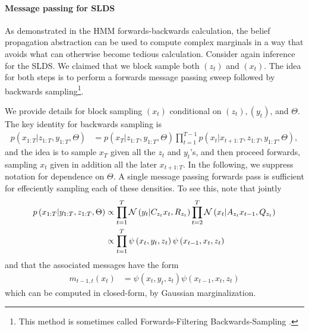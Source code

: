 \documentclass{article}
\begin{document}
\paragraph{Message passing for SLDS}

As demonstrated in the HMM forwards-backwards calculation, the belief
propagation abstraction can be used to compute complex marginals in a way that
avoids what can otherwise become tedious calculation. Consider again inference
for the SLDS. We claimed that we block sample both $\left(z_t\right)$ and
$\left(x_t\right)$. The idea for both steps is to perform a forwards message
passing sweep followed by backwards sampling\footnote{This method is sometimes
  called Forwards-Filtering Backwards-Sampling \citep{carter1994gibbs}.}.

We provide details for block sampling $\left(x_t\right)$ conditional on
$\left(z_t\right), \left(y_t\right)$, and $\Theta$. The key identity for
backwards sampling is
\begin{align*}
  p\left(x_{1:T} \vert z_{1:T}, y_{1:T}, \Theta\right) &= p\left(x_{T} \vert z_{1:T}, y_{1:T}, \Theta\right) \prod_{t = 1}^{T - 1} p\left(x_{t} \vert x_{t + 1:T}, z_{1:T}, y_{1:T}, \Theta\right),
\end{align*}
and the idea is to sample $x_{T}$ given all the $z_{t}$ and $y_{t}$'s, and then
proceed forwards, sampling $x_{t}$ given in addition all the later $x_{t +
  1:T}$. In the following, we suppress notation for dependence on $\Theta$. A
single message passing forwards pass is sufficient for effeciently sampling each
of these densities. To see this, note that jointly
\begin{align*}
  p\left(x_{1:T} \vert y_{1:T}, z_{1:T}, \Theta\right) &\propto
  \prod_{t = 1}^{T} \mathcal{N}\left(y_t \vert C_{z_t} x_t, R_{z_t}\right) \prod_{t = 2}^{T} \mathcal{N}\left(x_{t} \vert A_{z_t} x_{t - 1}, Q_{z_t}\right) \\
    &\propto\prod_{t = 1}^{T} \psi\left(x_{t}, y_{t}, z_{t}\right) \psi\left(x_{t - 1}, x_{t}, z_{t}\right)
\end{align*}
and that the associated messages have the form
\begin{align*}
  m_{t - 1, t}\left(x_t\right) &= \psi\left(x_{t} , y_t, z_t\right)\psi\left(x_{t - 1}, x_t, z_t\right)
\end{align*}
which can be computed in closed-form, by Gaussian marginalization.
\end{document}
